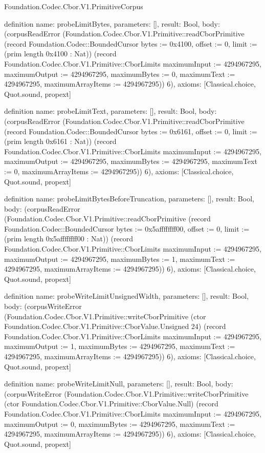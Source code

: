 \begin{lexlean}{Foundation.Codec.Cbor.V1.PrimitiveCorpus}
\begin{semanticmodule}
definition{
  name: probeLimitBytes,
  parameters: [],
  result: Bool,
  body: (corpusReadError (Foundation.Codec.Cbor.V1.Primitive::readCborPrimitive (record Foundation.Codec::BoundedCursor {bytes := 0x4100, offset := 0, limit := (prim length 0x4100 : Nat)}) (record Foundation.Codec.Cbor.V1.Primitive::CborLimits {maximumInput := 4294967295, maximumOutput := 4294967295, maximumBytes := 0, maximumText := 4294967295, maximumArrayItems := 4294967295})) 6),
  axioms: [Classical.choice, Quot.sound, propext]
}

definition{
  name: probeLimitText,
  parameters: [],
  result: Bool,
  body: (corpusReadError (Foundation.Codec.Cbor.V1.Primitive::readCborPrimitive (record Foundation.Codec::BoundedCursor {bytes := 0x6161, offset := 0, limit := (prim length 0x6161 : Nat)}) (record Foundation.Codec.Cbor.V1.Primitive::CborLimits {maximumInput := 4294967295, maximumOutput := 4294967295, maximumBytes := 4294967295, maximumText := 0, maximumArrayItems := 4294967295})) 6),
  axioms: [Classical.choice, Quot.sound, propext]
}

definition{
  name: probeLimitBytesBeforeTruncation,
  parameters: [],
  result: Bool,
  body: (corpusReadError (Foundation.Codec.Cbor.V1.Primitive::readCborPrimitive (record Foundation.Codec::BoundedCursor {bytes := 0x5affffffff00, offset := 0, limit := (prim length 0x5affffffff00 : Nat)}) (record Foundation.Codec.Cbor.V1.Primitive::CborLimits {maximumInput := 4294967295, maximumOutput := 4294967295, maximumBytes := 1, maximumText := 4294967295, maximumArrayItems := 4294967295})) 6),
  axioms: [Classical.choice, Quot.sound, propext]
}

definition{
  name: probeWriteLimitUnsignedWidth,
  parameters: [],
  result: Bool,
  body: (corpusWriteError (Foundation.Codec.Cbor.V1.Primitive::writeCborPrimitive (ctor Foundation.Codec.Cbor.V1.Primitive::CborValue.Unsigned 24) (record Foundation.Codec.Cbor.V1.Primitive::CborLimits {maximumInput := 4294967295, maximumOutput := 1, maximumBytes := 4294967295, maximumText := 4294967295, maximumArrayItems := 4294967295})) 6),
  axioms: [Classical.choice, Quot.sound, propext]
}

definition{
  name: probeWriteLimitNull,
  parameters: [],
  result: Bool,
  body: (corpusWriteError (Foundation.Codec.Cbor.V1.Primitive::writeCborPrimitive (ctor Foundation.Codec.Cbor.V1.Primitive::CborValue.Null) (record Foundation.Codec.Cbor.V1.Primitive::CborLimits {maximumInput := 4294967295, maximumOutput := 0, maximumBytes := 4294967295, maximumText := 4294967295, maximumArrayItems := 4294967295})) 6),
  axioms: [Classical.choice, Quot.sound, propext]
}


\end{semanticmodule}
\end{lexlean}
